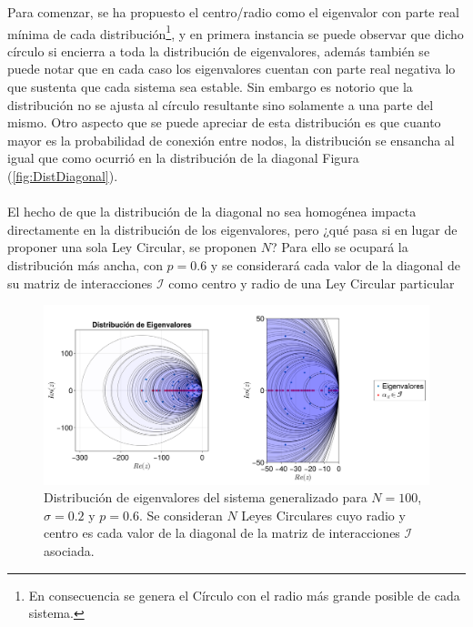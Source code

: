 Para comenzar, se ha propuesto el centro/radio como el eigenvalor con parte real mínima de cada distribución\footnote{En consecuencia se genera el Círculo con el radio más grande posible de cada sistema.}, y en primera instancia se puede observar que dicho círculo si encierra a toda la distribución de eigenvalores, además también se puede notar que en cada caso los eigenvalores cuentan con parte real negativa lo que sustenta que cada sistema sea estable. Sin embargo es notorio que la distribución no se ajusta al círculo resultante sino solamente a una parte del mismo. Otro aspecto que se puede apreciar de esta distribución es que cuanto mayor es la probabilidad de conexión entre nodos, la distribución se ensancha al igual que como ocurrió en la distribución de la diagonal Figura (\ref{fig:DistDiagonal}). \\
\\
El hecho de que la distribución de la diagonal no sea homogénea impacta directamente en la distribución de los eigenvalores, pero ¿qué pasa si en lugar de proponer una sola Ley Circular, se proponen $N$? Para ello se ocupará la distribución más ancha, con $p=0.6$ y se considerará cada valor de la diagonal de su matriz de interacciones $\mathcal{I}$ como centro y radio de una Ley Circular particular
\begin{figure}[h!]
	\centering
	\includegraphics[scale=0.17]{../Imagenes/LeyesCirculares}
	\caption{Distribución de eigenvalores del sistema generalizado para $N=100$, $\sigma=0.2$ y $p=0.6$. Se consideran $N$ Leyes Circulares cuyo radio y centro es cada valor de la diagonal de la matriz de interacciones $\mathcal{I}$ asociada. }
	\label{fig:LeyesCirculares}
\end{figure}

